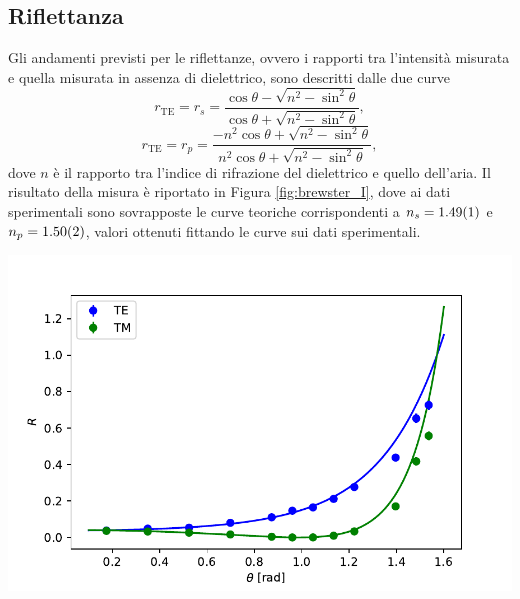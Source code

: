 \documentclass[10pt,oneside,a4paper]{article}
\newenvironment{Figure}
  {\par\medskip\noindent\minipage{\linewidth}}
  {\endminipage\par\medskip}
\begin{document}
\begin{multicols}{2}
\subsection{Riflettanza}
Gli andamenti previsti per le riflettanze, ovvero i rapporti tra l'intensità misurata e quella misurata in assenza di dielettrico, sono descritti dalle due curve
\begin{equation}\label{eq:rs}
	r_{\mathrm{TE}} = r_ s = \frac{\cos \theta - \sqrt{n^2 - \sin^2 \theta}}{\cos \theta + \sqrt{n^2 - \sin^2 \theta}},
\end{equation}
\begin{equation}\label{eq:rs}
	r_{\mathrm{TE}} = r_p =  \frac{-n^2 \cos \theta + \sqrt{n^2 - \sin^2 \theta}}{n^2 \cos \theta + \sqrt{n^2 - \sin^2 \theta}},
\end{equation}
dove $n$ è il rapporto tra l'indice di rifrazione del dielettrico e quello dell'aria.
Il risultato della misura è riportato in Figura \ref{fig:brewster_I}, dove ai dati sperimentali sono sovrapposte le curve teoriche corrispondenti a $n_s = \SI{1.49 \pm 0.01}{}$ e $n_p = \SI{1.50 \pm 0.02}{}$, valori ottenuti fittando le curve sui dati sperimentali.
\begin{Figure}
	\begin{center}
	\includegraphics[width=\linewidth]{riflettanze.pdf}
	\label{fig:brewster_I}
	\end{center}
\end{Figure}


\end{multicols}
\end{document}
